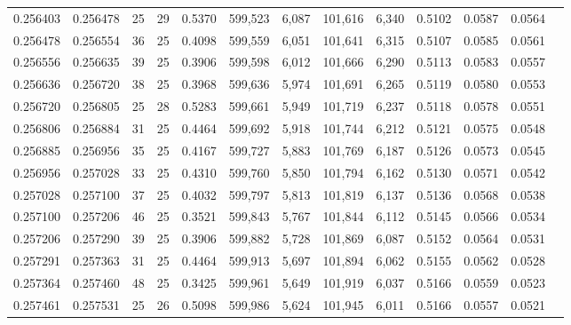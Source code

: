 \begin{tabular}{rrrrrrrrrrrrr}
0.256403 & 0.256478 &    25 &  29 &                                     0.5370 & 599,523 &   6,087 & 101,616 &   6,340 & 0.5102 & 0.0587 & 0.0564 \\
0.256478 & 0.256554 &    36 &  25 &                                     0.4098 & 599,559 &   6,051 & 101,641 &   6,315 & 0.5107 & 0.0585 & 0.0561 \\
0.256556 & 0.256635 &    39 &  25 &                                     0.3906 & 599,598 &   6,012 & 101,666 &   6,290 & 0.5113 & 0.0583 & 0.0557 \\
0.256636 & 0.256720 &    38 &  25 &                                     0.3968 & 599,636 &   5,974 & 101,691 &   6,265 & 0.5119 & 0.0580 & 0.0553 \\
0.256720 & 0.256805 &    25 &  28 &                                     0.5283 & 599,661 &   5,949 & 101,719 &   6,237 & 0.5118 & 0.0578 & 0.0551 \\
0.256806 & 0.256884 &    31 &  25 &                                     0.4464 & 599,692 &   5,918 & 101,744 &   6,212 & 0.5121 & 0.0575 & 0.0548 \\
0.256885 & 0.256956 &    35 &  25 &                                     0.4167 & 599,727 &   5,883 & 101,769 &   6,187 & 0.5126 & 0.0573 & 0.0545 \\
0.256956 & 0.257028 &    33 &  25 &                                     0.4310 & 599,760 &   5,850 & 101,794 &   6,162 & 0.5130 & 0.0571 & 0.0542 \\
0.257028 & 0.257100 &    37 &  25 &                                     0.4032 & 599,797 &   5,813 & 101,819 &   6,137 & 0.5136 & 0.0568 & 0.0538 \\
0.257100 & 0.257206 &    46 &  25 &                                     0.3521 & 599,843 &   5,767 & 101,844 &   6,112 & 0.5145 & 0.0566 & 0.0534 \\
0.257206 & 0.257290 &    39 &  25 &                                     0.3906 & 599,882 &   5,728 & 101,869 &   6,087 & 0.5152 & 0.0564 & 0.0531 \\
0.257291 & 0.257363 &    31 &  25 &                                     0.4464 & 599,913 &   5,697 & 101,894 &   6,062 & 0.5155 & 0.0562 & 0.0528 \\
0.257364 & 0.257460 &    48 &  25 &                                     0.3425 & 599,961 &   5,649 & 101,919 &   6,037 & 0.5166 & 0.0559 & 0.0523 \\
0.257461 & 0.257531 &    25 &  26 &                                     0.5098 & 599,986 &   5,624 & 101,945 &   6,011 & 0.5166 & 0.0557 & 0.0521 \\

\end{tabular}

